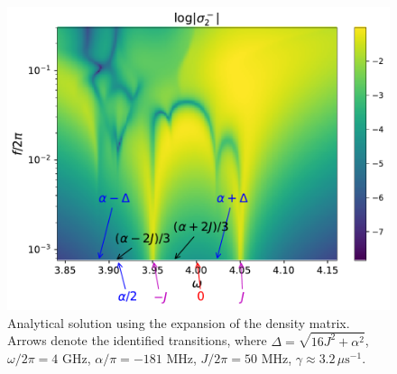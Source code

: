 \documentclass[%
 aps, pra,
 amsmath,amssymb,
 preprint,%
superscriptaddress
]{revtex4-2}
\begin{document}
\begin{figure}
	\includegraphics[width=0.7\linewidth]{Pictures/map-sminus-2qb3-log.pdf}
	\caption{Analytical solution using the expansion of the density matrix. Arrows denote the identified transitions, where $\Delta = \sqrt{16 J^2 + \alpha^2}$, $\omega/2\pi = 4$ GHz, $\alpha/\pi = -181$ MHz, $J/2\pi = 50$ MHz, $\gamma \approx 3.2\, \mu\text{s}^{-1}$.}
	\label{fig:map-sminus-2qb3-log}
\end{figure}
\end{document}
